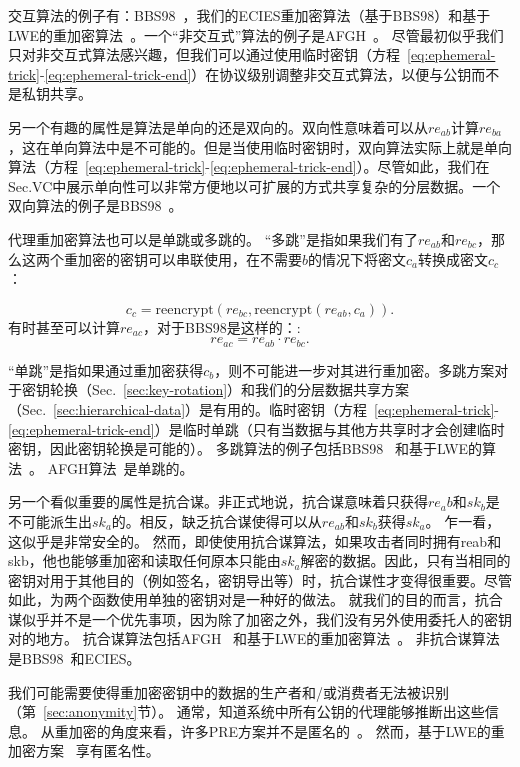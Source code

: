 \documentclass[longbibliography,nofootinbib]{revtex4-1}
\begin{document}
交互算法的例子有：BBS98~\cite{BBS98}，我们的ECIES重加密算法（基于BBS98）和基于LWE的重加密算法~\cite{lwe-reencryption}。一个“非交互式”算法的例子是AFGH~\cite{AFGH}。 尽管最初似乎我们只对非交互式算法感兴趣，但我们可以通过使用临时密钥（方程~\ref{eq:ephemeral-trick}-\ref{eq:ephemeral-trick-end}）在协议级别调整非交互式算法，以便与公钥而不是私钥共享。

另一个有趣的属性是算法是单向的还是双向的。双向性意味着可以从$re_{ab}$计算$re_{ba}$，这在单向算法中是不可能的。但是当使用临时密钥时，双向算法实际上就是单向算法（方程~\ref{eq:ephemeral-trick}-\ref{eq:ephemeral-trick-end}）。尽管如此，我们在Sec.VC中展示单向性可以非常方便地以可扩展的方式共享复杂的分层数据。一个双向算法的例子是BBS98~\cite{BBS98}。

    代理重加密算法也可以是单跳或多跳的。 “多跳”是指如果我们有了$re_{ab}$和$re_{bc}$，那么这两个重加密的密钥可以串联使用，在不需要$b$的情况下将密文$c_a$转换成密文$c_c$ ：

\begin{equation}
    c_c = \text{reencrypt}(re_{bc}, \text{reencrypt}(re_{ab}, c_a)).
\end{equation}
有时甚至可以计算$re_{ac}$，对于BBS98是这样的：:
\begin{equation}
    re_{ac} = re_{ab} \cdot re_{bc}.
\end{equation}

“单跳”是指如果通过重加密获得$c_b$，则不可能进一步对其进行重加密。多跳方案对于密钥轮换（Sec.~\ref{sec:key-rotation}）和我们的分层数据共享方案（Sec.~\ref{sec:hierarchical-data}）是有用的。临时密钥（方程~\ref{eq:ephemeral-trick}-\ref{eq:ephemeral-trick-end}）是临时单跳（只有当数据与其他方共享时才会创建临时密钥，因此密钥轮换是可能的）。 多跳算法的例子包括BBS98~\cite{BBS98} 和基于LWE的算法~\cite{lwe-reencryption}。 AFGH算法~\cite{AFGH}是单跳的。

另一个看似重要的属性是抗合谋。非正式地说，抗合谋意味着只获得$re_ab$和$sk_b$是不可能派生出$sk_a$的。相反，缺乏抗合谋使得可以从$re_{ab}$和$sk_b$获得$sk_a$。 乍一看，这似乎是非常安全的。 然而，即使使用抗合谋算法，如果攻击者同时拥有reab和skb，他也能够重加密和读取任何原本只能由$sk_a$解密的数据。因此，只有当相同的密钥对用于其他目的（例如签名，密钥导出等）时，抗合谋性才变得很重要。尽管如此，为两个函数使用单独的密钥对是一种好的做法。 就我们的目的而言，抗合谋似乎并不是一个优先事项，因为除了加密之外，我们没有另外使用委托人的密钥对的地方。 抗合谋算法包括AFGH~\cite{AFGH} 和基于LWE的重加密算法~\cite{lwe-reencryption}。 非抗合谋算法是BBS98~\cite{BBS98}和ECIES。


我们可能需要使得重加密密钥中的数据的生产者和/或消费者无法被识别（第~\ref{sec:anonymity}节）。 通常，知道系统中所有公钥的代理能够推断出这些信息。 从重加密的角度来看，许多PRE方案并不是匿名的~\cite{BBS98,AFGH}。 然而，基于LWE的重加密方案 ~\cite{lwe-reencryption}享有匿名性。
\end{document}
